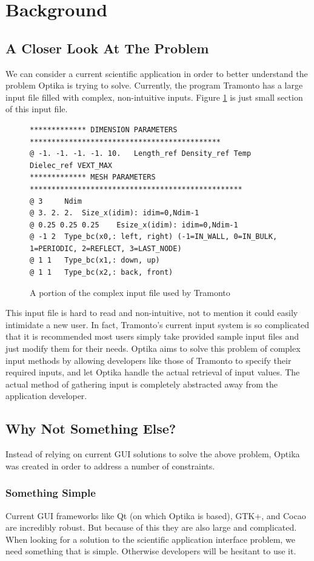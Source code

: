 \section{Background}
\subsection{A Closer Look At The Problem}
We can consider a current scientific application in order to better understand the problem Optika is trying to solve. 
Currently, the program Tramonto has a large input file filled with complex, non-intuitive inputs. Figure
\ref{tramontoInputFigure} is just small section of this input file.
\begin{figure}
  \centering
  {\footnotesize
  \begin{verbatim}
************* DIMENSION PARAMETERS ********************************************
@ -1. -1. -1. -1. 10. 	Length_ref Density_ref Temp Dielec_ref VEXT_MAX 
************* MESH PARAMETERS *************************************************
@ 3 	Ndim 
@ 3. 2. 2. 	Size_x(idim): idim=0,Ndim-1 
@ 0.25 0.25 0.25 	Esize_x(idim): idim=0,Ndim-1 
@ -1 2 	Type_bc(x0,: left, right) (-1=IN_WALL, 0=IN_BULK, 1=PERIODIC, 2=REFLECT, 3=LAST_NODE) 
@ 1 1 	Type_bc(x1,: down, up) 
@ 1 1 	Type_bc(x2,: back, front) 
  \end{verbatim}
  }
  \caption[Tramonto Input]{A portion of the complex input file used by Tramonto}
  \label{tramontoInputFigure}
\end{figure}

This input file is hard to read and non-intuitive, not to mention it could 
easily intimidate a new user. In fact, Tramonto's current input system is so complicated
that it is recommended most users simply take provided sample input files and just
modify them for their needs. Optika aims to solve this problem of complex input methods by allowing developers
like those of Tramonto to specify their required inputs, and let Optika handle the actual retrieval of
input values. The actual method of gathering input is completely abstracted away from the application developer.

\subsection{Why Not Something Else?}
Instead of relying on current GUI solutions to solve the above problem, Optika was created in order to address
a number of constraints.

\subsubsection{Something Simple}
Current GUI frameworks like Qt (on which Optika is based), GTK+, and Cocao are incredibly robust. But
because of this they are also large and complicated. When looking for a solution to the 
scientific application interface problem, we need something that is simple. Otherwise developers will be hesitant to use it.

